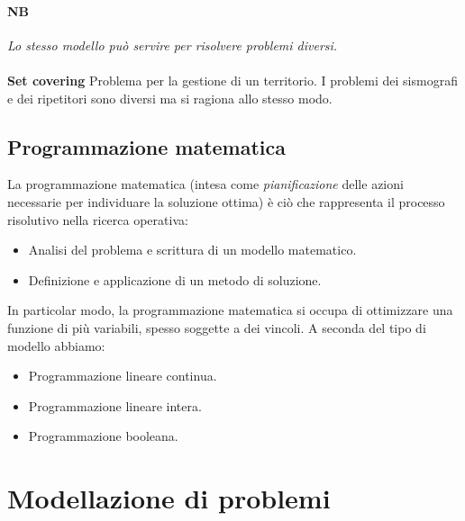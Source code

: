 \documentclass[12pt, twoside, letterpaper]{article}
\begin{document}
		\paragraph{NB}\textit{Lo stesso modello può servire per risolvere problemi diversi.}
		\\\\\textbf{Set covering }Problema per la gestione di un territorio. I problemi dei sismografi e dei ripetitori sono diversi ma si ragiona allo stesso modo.
		\subsection{Programmazione matematica} La programmazione matematica (intesa come \textit{pianificazione} delle azioni necessarie per individuare la soluzione ottima) è ciò che rappresenta il processo risolutivo nella ricerca operativa: 
			\begin{itemize}
				\item Analisi del problema e scrittura di un modello matematico.
				\item Definizione e applicazione di un metodo di soluzione.
			\end{itemize}
		In particolar modo, la programmazione matematica si occupa di ottimizzare una funzione di più variabili, spesso soggette a dei vincoli. A seconda del tipo di modello abbiamo:
		\begin{itemize}
			\item Programmazione lineare continua.
			\item Programmazione lineare intera.
			\item Programmazione booleana.
		\end{itemize}
	
	\section{Modellazione di problemi}
	
\end{document}
